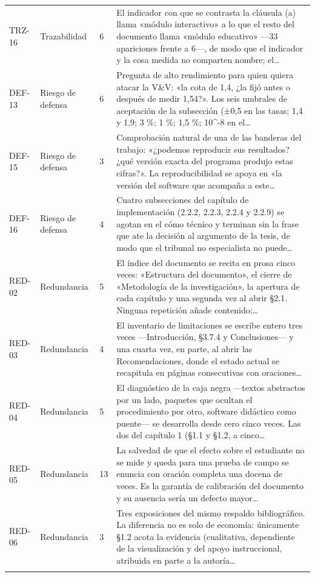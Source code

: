 {\begin{longtable}{@{}L{1.4cm}L{2.6cm}L{1.2cm}L{10.05cm}@{}}
TRZ-16 & Trazabilidad & 6 & El indicador con que se contrasta la cláusula (a) llama «módulo interactivo» a lo que el resto del documento llama «módulo educativo» —33 apariciones frente a 6—, de modo que el indicador y la cosa medida no comparten nombre; el…\\\addlinespace[2pt]
DEF-13 & Riesgo de defensa & 6 & Pregunta de alto rendimiento para quien quiera atacar la V\&V: «la cota de 1,4, ¿la fijó antes o después de medir 1,54?». Los seis umbrales de aceptación de la subsección (±0,5 en las tasas; 1,4 y 1,9; 3 \%; 1 \%; 1,5 \%; 10\textasciicircum{}-8 en el…\\\addlinespace[2pt]
DEF-15 & Riesgo de defensa & 3 & Comprobación natural de una de las banderas del trabajo: «¿podemos reproducir sus resultados? ¿qué versión exacta del programa produjo estas cifras?». La reproducibilidad se apoya en «la versión del software que acompaña a este…\\\addlinespace[2pt]
DEF-16 & Riesgo de defensa & 4 & Cuatro subsecciones del capítulo de implementación (2.2.2, 2.2.3, 2.2.4 y 2.2.9) se agotan en el cómo técnico y terminan sin la frase que ate la decisión al argumento de la tesis, de modo que el tribunal no especialista no puede…\\\addlinespace[2pt]
RED-02 & Redundancia & 5 & El índice del documento se recita en prosa cinco veces: «Estructura del documento», el cierre de «Metodología de la investigación», la apertura de cada capítulo y una segunda vez al abrir §2.1. Ninguna repetición añade contenido;…\\\addlinespace[2pt]
RED-03 & Redundancia & 4 & El inventario de limitaciones se escribe entero tres veces —Introducción, §3.7.4 y Conclusiones— y una cuarta vez, en parte, al abrir las Recomendaciones, donde el estado actual se recapitula en páginas consecutivas con oraciones…\\\addlinespace[2pt]
RED-04 & Redundancia & 5 & El diagnóstico de la caja negra —textos abstractos por un lado, paquetes que ocultan el procedimiento por otro, software didáctico como puente— se desarrolla desde cero cinco veces. Las dos del capítulo 1 (§1.1 y §1.2, a cinco…\\\addlinespace[2pt]
RED-05 & Redundancia & 13 & La salvedad de que el efecto sobre el estudiante no se mide y queda para una prueba de campo se enuncia con oración completa una docena de veces. Es la garantía de calibración del documento y su ausencia sería un defecto mayor…\\\addlinespace[2pt]
RED-06 & Redundancia & 3 & Tres exposiciones del mismo respaldo bibliográfico. La diferencia no es solo de economía: únicamente §1.2 acota la evidencia (cualitativa, dependiente de la visualización y del apoyo instruccional, atribuida en parte a la autoría…\\\addlinespace[2pt]

\end{longtable}}
